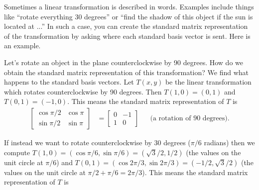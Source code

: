 Sometimes a linear transformation is described in words.  Examples include things like ``rotate everything 30 degrees'' or ``find the shadow of this object if the sun is located at ...''  In such a case, you can create the standard matrix representation of the transformation by asking where each standard basis vector is sent.  Here is an example.

\begin{example}
Let's rotate an object in the plane counterclockwise by 90 degrees. 
How do we obtain the standard matrix representation of this transformation? 
We find what happens to the standard basis vectors. 
Let $T(x,y)$ be the linear transformation which rotates counterclockwise by 90 degrees.  Then $T(1,0)=(0,1)$ and $T(0,1)=(-1,0)$.  
This means the standard matrix representation of $T$ is 
\begin{align*}
\begin{bmatrix}
\cos \pi/2&\cos\pi\\
\sin\pi/2&\sin\pi
\end{bmatrix}&=\begin{bmatrix}0&-1\\1&0\end{bmatrix} && \text{(a rotation of 90 degrees)}.
\end{align*}

If instead we want to rotate counterclockwise by 30 degrees ($\pi/6$ radians)  then we compute 
$T(1,0) = (\cos \pi/6, \sin \pi/6) = (\sqrt3/2,1/2)$ (the values on the unit circle at $\pi/6$)  and 
$T(0,1) = (\cos 2\pi/3, \sin 2\pi/3) = (-1/2,\sqrt3/2) $ (the values on the unit circle at $\pi/2+\pi/6 = 2\pi/3$). 
This means the standard matrix representation of $T$ is 
\end{example}
